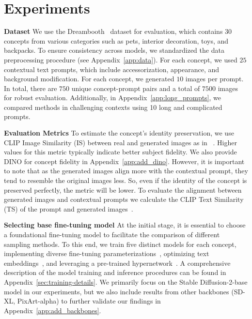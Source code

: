 \section{Experiments} \label{sec:experiments}


\textbf{Dataset} We use the Dreambooth~\citep{DB} dataset for evaluation, which contains $30$ concepts from various categories such as pets, interior decoration, toys, and backpacks. To ensure consistency across models, we standardized the data preprocessing procedure (see Appendix~\ref{app:data}). For each concept, we used $25$ contextual text prompts, which include accessorization, appearance, and background modification. For each concept, we generated $10$ images per prompt. In total, there are $750$ unique concept-prompt pairs and a total of $7500$ images for robust evaluation. Additionally, in Appendix~\ref{app:long_prompts}, we compared methods in challenging contexts using 10 long and complicated prompts.

\textbf{Evaluation Metrics}
To estimate the concept's identity preservation, we use CLIP Image Similarity (IS) between real and generated images as in ~\citep{DB}. Higher values for this metric typically indicate better subject fidelity. We also provide DINO for concept fidelity in Appendix~\ref{app:add_dino}. However, it is important to note that as the generated images align more with the contextual prompt, they tend to resemble the original images less. So, even if the identity of the concept is preserved perfectly, the metric will be lower. To evaluate the alignment between generated images and contextual prompts we calculate the CLIP Text Similarity (TS) of the prompt and generated images~\citep{TI}.

\textbf{Selecting base fine-tuning model} At the initial stage, it is essential to choose a foundational fine-tuning model to facilitate the comparison of different sampling methods. To this end, we train five distinct models for each concept, implementing diverse fine-tuning parameterizations~\citep{DB, svdiff}, optimizing text embeddings~\citep{TI, CD}, and leveraging a pre-trained hypernetwork~\citep{elite}. A comprehensive description of the model training and inference procedures can be found in Appendix~\ref{sec:training-details}. We primarily focus on the Stable Diffusion-2-base model in our experiments, but we also include results from other backbones (SD-XL, PixArt-alpha) to further validate our findings in Appendix~\ref{app:add_backbones}.


